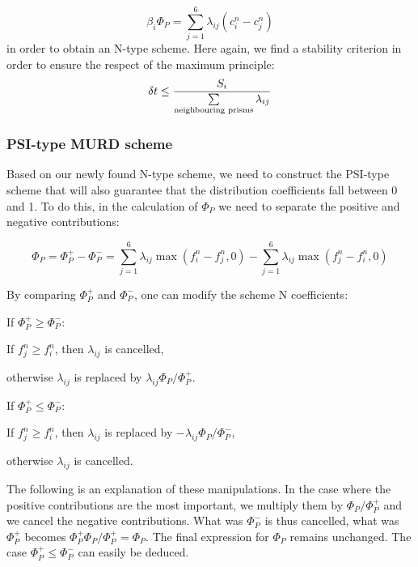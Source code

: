 \begin{equation}
\beta_{i}\Phi_{P}=\sum\limits_{j=1}^{6}\lambda_{ij}(c_{i}^{n}-c_{j}^{n})
\end{equation}
in order to obtain an N-type scheme. Here again, we find a stability criterion
in order to ensure the respect of the maximum principle:%
\begin{equation}
\delta t\leq\dfrac{S_{i}}{\sum\limits_{\text{neighbouring\thinspace\thinspace
prisms}}\lambda_{ij}}%
\end{equation}


\subsubsection{PSI-type MURD scheme}

Based on our newly found N-type scheme, we need to construct the PSI-type
scheme that will also guarantee that the distribution coefficients fall
between 0 and 1. To do this, in the calculation of $\Phi_{P}$ we need to
separate the positive and negative contributions:%

\begin{equation}
\Phi_{P}=\Phi_{P}^{+}-\Phi_{P}^{-}=\sum\limits_{j=1}^{6}\lambda_{ij}\max
(f_{i}^{n}-f_{j}^{n},0)-\sum\limits_{j=1}^{6}\lambda_{ij}\max(f_{j}^{n}%
-f_{i}^{n},0)
\end{equation}


By comparing $\Phi_{P}^{+}$ and $\Phi_{P}^{-}$, one can modify the scheme N coefficients:

If $\Phi_{P}^{+}\geq\Phi_{P}^{-}$:

\qquad If $f_{j}^{n}\geq f_{i}^{n}$, then $\lambda_{ij}$ is cancelled,

\qquad otherwise $\lambda_{ij}$ is replaced by $\lambda_{ij}\Phi_{P}/\Phi_{P}^{+}$.

If $\Phi_{P}^{+}\leq\Phi_{P}^{-}$:

\qquad If $f_{j}^{n}\geq f_{i}^{n}$, then $\lambda_{ij}$ is replaced by
$-\lambda_{ij}\Phi_{P}/\Phi_{P}^{-}$,

\qquad otherwise $\lambda_{ij}$ is cancelled.

The following is an explanation of these manipulations. In the case where the
positive contributions are the most important, we multiply them by $\Phi_{P}/\Phi_{P}^{+}$
and we cancel the negative contributions. What was $\Phi_{P}^{-}$ is thus cancelled,
what was $\Phi_{P}^{+}$ becomes $\Phi _{P}^{+}\Phi_{P}/\Phi_{P}^{+}=\Phi_{P}$. The final expression for
$\Phi_{P}$ remains unchanged. The case $\Phi_{P}^{+}\leq\Phi_{P}^{-}$ can
easily be deduced.

